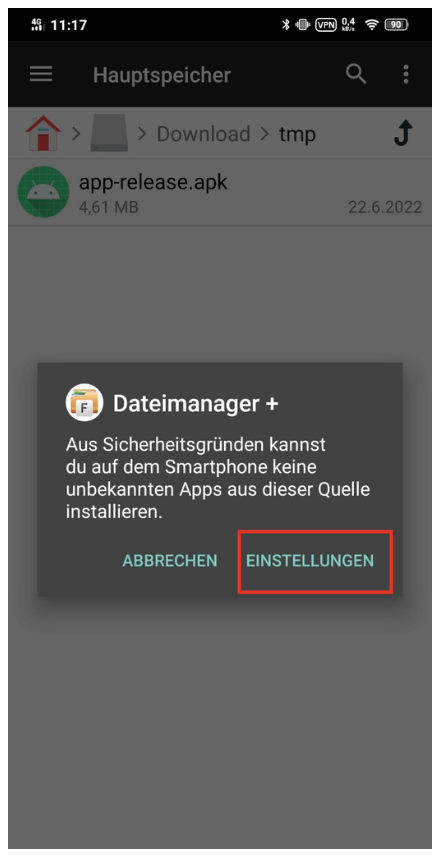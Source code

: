\documentclass{article}
\begin{document}
\begin{enumerate}
        \begin{minipage}{0.5\textwidth}
        \begin{figure}[H]
            \includegraphics[scale=0.85]{16.jpg}
            \centering
        \end{figure}

\end{minipage}
\end{enumerate}
\end{document}
